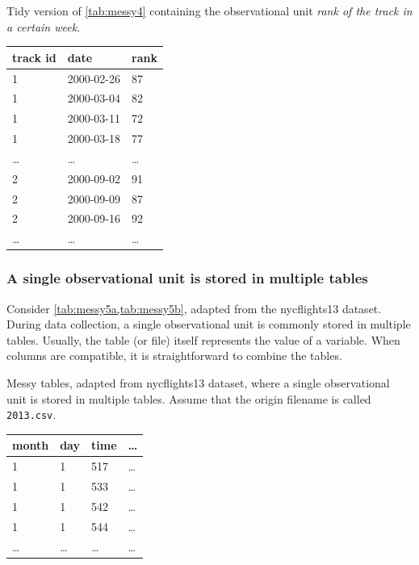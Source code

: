 \begin{tablebox}[label=tab:tidy4b]{Tidy version of \cref{tab:messy4} containing the observational unit \emph{rank of the track in a certain week}.}
  \centering
  \begin{tabular}{lll}
    \toprule
    \textbf{track id} & \textbf{date} & \textbf{rank} \\
    \midrule
    1 & 2000-02-26 & 87 \\
    1 & 2000-03-04 & 82 \\
    1 & 2000-03-11 & 72 \\
    1 & 2000-03-18 & 77 \\
    \dots & \dots & \dots \\
    2 & 2000-09-02 & 91 \\
    2 & 2000-09-09 & 87 \\
    2 & 2000-09-16 & 92 \\
    \dots & \dots & \dots \\
    \bottomrule
  \end{tabular}
\end{tablebox}

\subsubsection{A single observational unit is stored in multiple tables}
Consider \cref{tab:messy5a,tab:messy5b}, adapted from the nycflights13
dataset.  During data collection, a single observational unit
is commonly stored in multiple tables.  Usually, the table (or file) itself represents the
value of a variable.  When columns are compatible, it is straightforward to combine the
tables.

\begin{tablebox}[label=tab:messy5a]{Messy tables, adapted from nycflights13 dataset, where
  a single observational unit is stored in multiple tables.  Assume that the origin
  filename is called \texttt{2013.csv}.}
  \centering
  \begin{tabular}{llll}
    \toprule
    \textbf{month} & \textbf{day} & \textbf{time} & \textbf{\dots} \\
    \midrule
    1 & 1 & 517 & \dots \\
    1 & 1 & 533 & \dots \\
    1 & 1 & 542 & \dots \\
    1 & 1 & 544 & \dots \\
    \dots & \dots & \dots & \dots \\
    \bottomrule
  \end{tabular}
\end{tablebox}

